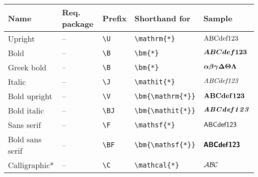 \documentclass[]{article}
\begin{document}
\begin{table}[htbp]
  \hspace{-1.8cm}
  \begin{tabular}{l l l l l}
    \toprule
    Name & Req. package & Prefix & Shorthand for & Sample \\
    \midrule
    Upright & -- & \verb+\U+ & \verb+\mathrm{*}+ & $\UA\UB\UC\Ud\Ue\Uf\Uone\Utwo\Uthree$\\
    Bold & -- & \verb+\B+ & \verb+\bm{*}+ & $\BA\BB\BC\Bd\Be\Bf\Bone\Btwo\Bthree$ \\
    Greek bold & -- & \verb+\B+ & \verb+\bm{*}+ & $\Balpha\Bbeta\Bgamma\BDelta\BTheta\BLambda$ \\
    Italic & -- & \verb+\J+ & \verb+\mathit{*}+ & $\JA\JB\JC\Jd\Je\Jf\Jone\Jtwo\Jthree$ \\
    Bold upright & -- & \verb+\V+ & \verb+\bm{\mathrm{*}}+ & $\VA\VB\VC\Vd\Ve\Vf\Vone\Vtwo\Vthree$ \\
    Bold italic & -- & \verb+\BJ+ & \verb+\bm{\mathit{*}}+ & $\BJA\BJB\BJC\BJd\BJe\BJf\BJone\BJtwo\BJthree$ \\
    Sans serif & -- & \verb+\F+ & \verb+\mathsf{*}+ & $\FA\FB\FC\Fd\Fe\Ff\Fone\Ftwo\Fthree$\\
    Bold sans serif & -- & \verb+\BF+ & \verb+\bm{\mathsf{*}}+ & $\BFA\BFB\BFC\BFd\BFe\BFf\BFone\BFtwo\BFthree$\\
    Calligraphic* & -- & \verb+\C+ & \verb+\mathcal{*}+ & $\CA\CB\CC$ \\

\end{tabular}
\end{table}
\end{document}
